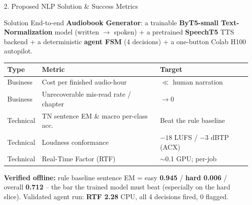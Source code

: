 \documentclass[10pt,aspectratio=169]{beamer}
\begin{document}
\begin{frame}{2. Proposed NLP Solution \& Success Metrics}
\begin{block}{Solution}
End-to-end \textbf{Audiobook Generator}: a trainable \textbf{ByT5-small Text-Normalization} model (written $\rightarrow$ spoken) + a pretrained \textbf{SpeechT5} TTS backend + a deterministic \textbf{agent FSM} (4 decisions) + a one-button Colab H100 autopilot.
\end{block}

\begin{table}[h]
\centering\small
\begin{tabular}{lll}
\toprule
\textbf{Type} & \textbf{Metric} & \textbf{Target} \\
\midrule
Business & Cost per finished audio-hour & $\ll$ human narration \\
Business & Unrecoverable mis-read rate / chapter & $\rightarrow 0$ \\
Technical & TN sentence EM \& macro per-class acc. & Beat the rule baseline \\
Technical & Loudness conformance & $-18$ LUFS / $-3$ dBTP (ACX) \\
Technical & Real-Time Factor (RTF) & $\sim$0.1 GPU; per-job \\
\bottomrule
\end{tabular}
\end{table}

\textbf{Verified offline:} rule baseline sentence EM = easy \textbf{0.945} / \textbf{hard 0.006} / overall \textbf{0.712} -- the bar the trained model must beat (especially on the hard slice). Validated agent run: \textbf{RTF 2.28} CPU, all 4 decisions fired, 0 flagged.
\end{frame}
\end{document}
